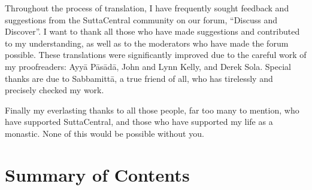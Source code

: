 \documentclass[12pt,openany]{book}%
\begin{document}
Throughout the process of translation, I have frequently sought feedback and suggestions from the SuttaCentral community on our forum, “Discuss and Discover”. I want to thank all those who have made suggestions and contributed to my understanding, as well as to the moderators who have made the forum possible. These translations were significantly improved due to the careful work of my proofreaders: \textsanskrit{Ayyā} \textsanskrit{Pāsādā}, John and Lynn Kelly, and Derek Sola. Special thanks are due to \textsanskrit{Sabbamittā}, a true friend of all, who has tirelessly and precisely checked my work.

Finally my everlasting thanks to all those people, far too many to mention, who have supported SuttaCentral, and those who have supported my life as a monastic. None of this would be possible without you.

%
\chapter*{Summary of Contents}
\end{document}

